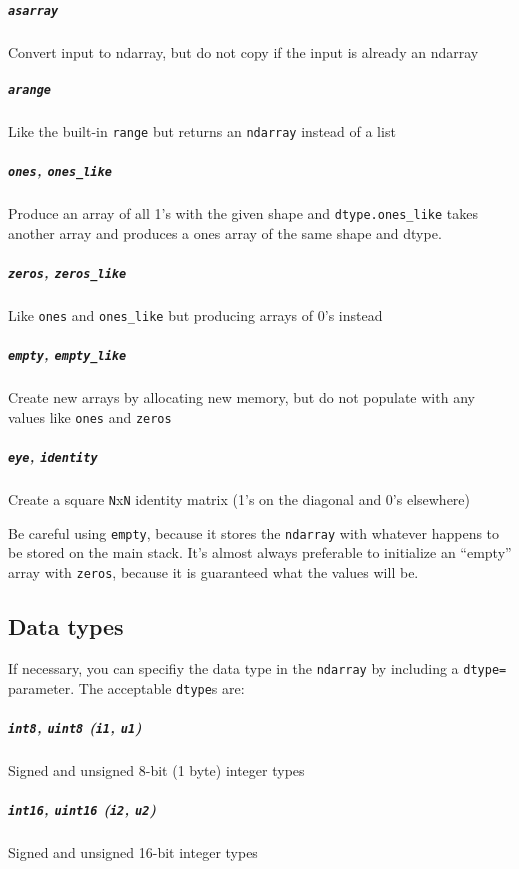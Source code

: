 \documentclass{article}
\begin{document}
\subparagraph{\texttt{asarray}}\label{asarray}

Convert input to ndarray, but do not copy if the input is already an
ndarray

\subparagraph{\texttt{arange}}\label{arange}

Like the built-in \texttt{range} but returns an \texttt{ndarray} instead
of a list

\subparagraph{\texttt{ones},
\texttt{ones\_like}}\label{ones-onesux5flike}

Produce an array of all 1's with the given shape and
\texttt{dtype.ones\_like} takes another array and produces a ones array
of the same shape and dtype.

\subparagraph{\texttt{zeros},
\texttt{zeros\_like}}\label{zeros-zerosux5flike}

Like \texttt{ones} and \texttt{ones\_like} but producing arrays of 0's
instead

\subparagraph{\texttt{empty},
\texttt{empty\_like}}\label{empty-emptyux5flike}

Create new arrays by allocating new memory, but do not populate with any
values like \texttt{ones} and \texttt{zeros}

\subparagraph{\texttt{eye}, \texttt{identity}}\label{eye-identity}

Create a square \texttt{N}x\texttt{N} identity matrix (1's on the
diagonal and 0's elsewhere)

Be careful using \texttt{empty}, because it stores the \texttt{ndarray}
with whatever happens to be stored on the main stack. It's almost always
preferable to initialize an ``empty'' array with \texttt{zeros}, because
it is guaranteed what the values will be.

    \subsection{Data types}\label{data-types}

If necessary, you can specifiy the data type in the \texttt{ndarray} by
including a \texttt{dtype=} parameter. The acceptable \texttt{dtype}s
are:

\subparagraph{\texttt{int8}, \texttt{uint8} (\texttt{i1},
\texttt{u1})}\label{int8-uint8-i1-u1}

Signed and unsigned 8-bit (1 byte) integer types

\subparagraph{\texttt{int16}, \texttt{uint16} (\texttt{i2},
\texttt{u2})}\label{int16-uint16-i2-u2}

Signed and unsigned 16-bit integer types
\end{document}
